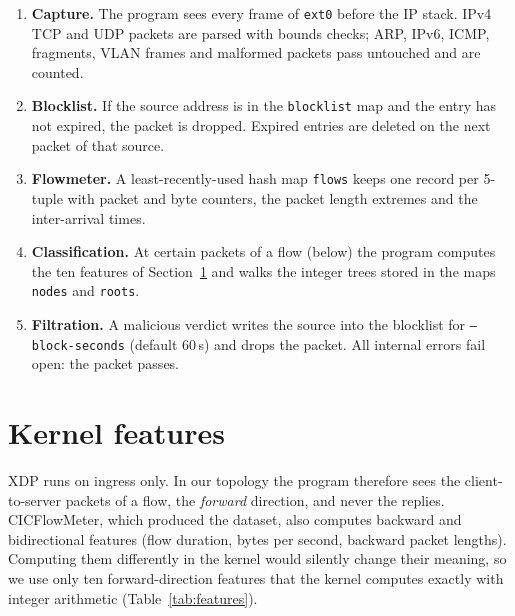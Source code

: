 \begin{enumerate}\setlength\itemsep{0pt}
	\item \textbf{Capture.} The program sees every frame of \texttt{ext0} before the IP stack. IPv4 TCP and UDP packets are parsed with bounds checks; ARP, IPv6, ICMP, fragments, VLAN frames and malformed packets pass untouched and are counted.
	\item \textbf{Blocklist.} If the source address is in the \texttt{blocklist} map and the entry has not expired, the packet is dropped. Expired entries are deleted on the next packet of that source.
	\item \textbf{Flowmeter.} A least-recently-used hash map \texttt{flows} keeps one record per 5-tuple with packet and byte counters, the packet length extremes and the inter-arrival times.
	\item \textbf{Classification.} At certain packets of a flow (below) the program computes the ten features of Section~\ref{sec:features} and walks the integer trees stored in the maps \texttt{nodes} and \texttt{roots}.
	\item \textbf{Filtration.} A malicious verdict writes the source into the blocklist for \texttt{--block-seconds} (default 60\,s) and drops the packet. All internal errors fail open: the packet passes.
\end{enumerate}

\section{Kernel features}\label{sec:features}
XDP runs on ingress only. In our topology the program therefore sees the client-to-server packets of a flow, the \emph{forward} direction, and never the replies. CICFlowMeter, which produced the dataset, also computes backward and bidirectional features (flow duration, bytes per second, backward packet lengths). Computing them differently in the kernel would silently change their meaning, so we use only ten forward-direction features that the kernel computes exactly with integer arithmetic (Table~\ref{tab:features}).

